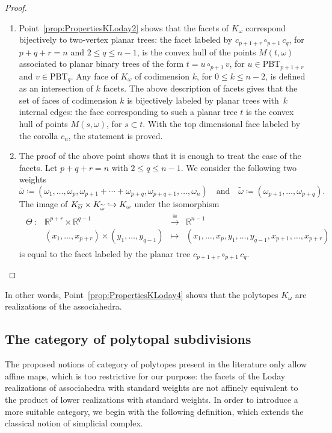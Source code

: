 \documentclass[11pt]{article}
\numberwithin{equation}{section}\providecommand{\No}{}
\def\hto{\mathrel{\lhook\joinrel\to}}
\theoremstyle{plain}
\theoremstyle{definition}
\newcommand{\RR}{\mathbb{R}}
\newcommand{\K}{{K}}
\newcommand{\Tam}[1]{\mathrm{PBT}_{#1}}
\begin{document}
\begin{proof}
\begin{enumerate}
\item Point~\eqref{prop:PropertiesKLoday2} shows that the facets of $\K_\omega$ correspond bijectively to two-vertex planar trees: the facet labeled by
$c_{p+1+r}\circ_{p+1} c_q$, for $p+q+r=n$ and $2\leq q \leq n-1$, is the convex hull of the points $M(t, \omega)$ associated to planar binary trees of the form $t=u\circ_{p+1} v$, for $u\in\Tam{p+1+r}$ and $v\in \Tam{q}$.
Any face of $\K_\omega$ of codimension $k$, for
$0\leq k \leq n-2$, is defined as an intersection of $k$ facets. The above description of facets gives that the set of faces of codimension $k$ is bijectively labeled by planar trees with~$k$ internal edges: the face corresponding to such a planar tree $t$ is the convex hull of points $M(s, \omega)$, for $s\subset t$. With the top dimensional face labeled by the corolla $c_n$, the statement is proved.

\item The proof of the above point shows that it is enough to treat the case of the facets.
Let $p+q+r=n$ with $2\leq q \leq n-1$. We consider the following two weights
\[
\overline{\omega}\coloneqq (\omega_1, \ldots, \omega_{p}, \omega_{p+1}+\cdots+\omega_{p+q}, \omega_{p+q+1}, \ldots, \omega_{n})
\quad \text{and} \quad
\widetilde{\omega}\coloneqq (\omega_{p+1}, \ldots, \omega_{p+q}).
\]
The image of $\K_{\overline{\omega}}\times \K_{\widetilde{\omega}}\hto \K_\omega$ under the isomorphism
\begin{align*}
\begin{array}{rccc}
\Theta\ : & \RR^{p+r}\times \RR^{q-1} &\xrightarrow{~\cong~} &\RR^{n-1}\\
&(x_1, \ldots, x_{p+r})\times (y_1, \ldots, y_{q-1}) & \longmapsto&
(x_1, \ldots, x_{p}, y_1, \ldots, y_{q-1}, x_{p+1}, \ldots, x_{p+r})
\end{array}
\end{align*}
is equal to the facet labeled by the planar tree $c_{p+1+r}\circ_{p+1} c_q$.\qedhere
\end{enumerate}
\end{proof}

In other words, Point~\eqref{prop:PropertiesKLoday4} shows that the polytopes $\K_\omega$ are realizations of the associahedra.

\subsection{The category of polytopal subdivisions}
The proposed notions of category of polytopes present in the literature only allow affine maps, which is too restrictive for our purpose: the facets of the Loday realizations of associahedra with standard weights are not affinely equivalent to the product of lower realizations with standard weights. In order to introduce a more suitable category, we begin with the following definition, which extends the classical notion of simplicial complex.
\end{document}
